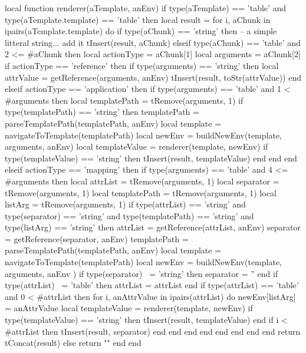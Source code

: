 {{\startLuaCode
local function renderer(aTemplate, anEnv)
  if type(aTemplate) == 'table' and
     type(aTemplate.template) == 'table' then
    local result = { }
    for i, aChunk in ipairs(aTemplate.template) do
      if type(aChunk) == 'string' then
        -- a simple litteral string... add it
        tInsert(result, aChunk)
      elseif type(aChunk) == 'table' and 2 <= #aChunk then
        local actionType = aChunk[1]
        local arguments  = aChunk[2]
        if actionType == 'reference' then
          if type(arguments) == 'string' then
            local attrValue = getReference(arguments, anEnv)
            tInsert(result, toStr(attrValue))
          end
        elseif actionType == 'application' then
          if type(arguments) == 'table' and 1 < #arguments then
            local templatePath = tRemove(arguments, 1)
            if type(templatePath) == 'string' then
              templatePath   = parseTemplatePath(templatePath, anEnv)
              local template = navigateToTemplate(templatePath)
              local newEnv   = buildNewEnv(template, arguments, anEnv)
              local templateValue = renderer(template, newEnv)
              if type(templateValue) == 'string' then
                tInsert(result, templateValue)
              end
            end
          end
        elseif actionType == 'mapping' then
          if type(arguments) == 'table' and 4 <= #arguments then
            local attrList     = tRemove(arguments, 1)
            local separator    = tRemove(arguments, 1)
            local templatePath = tRemove(arguments, 1)
            local listArg      = tRemove(arguments, 1)
            if type(attrList)     == 'string' and
               type(separator)    == 'string' and
               type(templatePath) == 'string' and
               type(listArg)      == 'string' then
              attrList       = getReference(attrList,  anEnv)
              separator      = getReference(separator, anEnv)
              templatePath   = parseTemplatePath(templatePath, anEnv)
              local template = navigateToTemplate(templatePath)
              local newEnv   = buildNewEnv(template, arguments, anEnv )
              if type(separator) ~= 'string' then
                separator = ''
              end
              if type(attrList) ~= 'table' then
                attrList = { attrList }
              end
              if type(attrList) == 'table' and 0 < #attrList then
                for i, anAttrValue in ipairs(attrList) do
                  newEnv[listArg] = anAttrValue
                  local templateValue = renderer(template, newEnv)
                  if type(templateValue) == 'string' then
                    tInsert(result, templateValue)
                  end
                  if i < #attrList then
                    tInsert(result, separator)
                  end
                end
              end
            end
          end
        end
      end
    end
    return tConcat(result)
  else
    return ""
  end
end

}}

